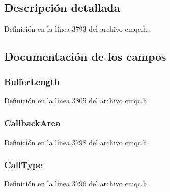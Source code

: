 \subsection{Descripción detallada}


Definición en la línea 3793 del archivo cmqc.\+h.



\subsection{Documentación de los campos}
\hypertarget{structtag_m_q_c_b_c_a4c13f4abce01a1fd714fb33ca2491583}{}
\subsubsection[{Buffer\+Length}]{ Buffer\+Length}\label{structtag_m_q_c_b_c_a4c13f4abce01a1fd714fb33ca2491583}


Definición en la línea 3805 del archivo cmqc.\+h.

\hypertarget{structtag_m_q_c_b_c_aec315c62e18aa72c5d04cadada50f160}{}
\subsubsection[{Callback\+Area}]{ Callback\+Area}\label{structtag_m_q_c_b_c_aec315c62e18aa72c5d04cadada50f160}


Definición en la línea 3798 del archivo cmqc.\+h.

\hypertarget{structtag_m_q_c_b_c_a0b568439fe1c5ce8239604c1ec58a387}{}
\subsubsection[{Call\+Type}]{ Call\+Type}\label{structtag_m_q_c_b_c_a0b568439fe1c5ce8239604c1ec58a387}


Definición en la línea 3796 del archivo cmqc.\+h.


